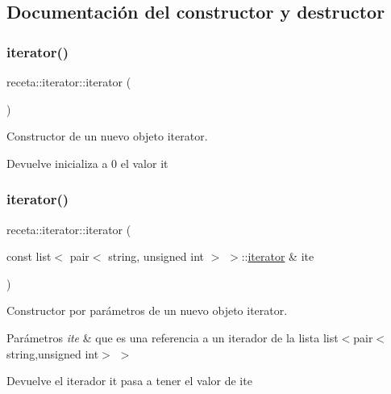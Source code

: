 \subsection{Documentación del constructor y destructor}
\mbox{\label{classreceta_1_1iterator_a4cc712c12bb8e7ac1488e07def470a0b}} 
\subsubsection{\texorpdfstring{iterator()}{iterator()}\hspace{0.1cm}{\footnotesize\ttfamily [1/3]}}
{\footnotesize\ttfamily receta\+::iterator\+::iterator (\begin{DoxyParamCaption}{ }\end{DoxyParamCaption})\hspace{0.3cm}{\ttfamily [inline]}}



Constructor de un nuevo objeto iterator. 

\begin{DoxyReturn}{Devuelve}
inicializa a 0 el valor it 
\end{DoxyReturn}
\mbox{\label{classreceta_1_1iterator_a3372167925372df4a8895b4337b8dcbf}} 
\subsubsection{\texorpdfstring{iterator()}{iterator()}\hspace{0.1cm}{\footnotesize\ttfamily [2/3]}}
{\footnotesize\ttfamily receta\+::iterator\+::iterator (\begin{DoxyParamCaption}\item[{const list$<$ pair$<$ string, unsigned int $>$ $>$\+::\hyperlink{classreceta_1_1iterator}{iterator} \&}]{ite }\end{DoxyParamCaption})\hspace{0.3cm}{\ttfamily [inline]}}



Constructor por parámetros de un nuevo objeto iterator. 


\begin{DoxyParams}{Parámetros}
{\em ite} & que es una referencia a un iterador de la lista list$<$pair$<$string,unsigned int$>$ $>$ \\
\hline
\end{DoxyParams}
\begin{DoxyReturn}{Devuelve}
el iterador it pasa a tener el valor de ite 
\end{DoxyReturn}
\mbox{\label{classreceta_1_1iterator_a79ccd945ca622fc03f1d0b91a3feefa0}} 
